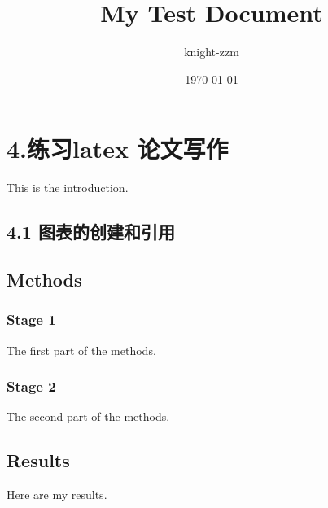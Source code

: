 \documentclass[a4paper,12pt]{report}
\begin{document}
\title{My Test Document}
\author{knight-zzm}
\date{\today}
\maketitle

\chapter*{4.练习latex 论文写作}
This is the introduction.

\section*{4.1 图表的创建和引用}
\section{Methods}

\subsection{Stage 1}
The first part of the methods.

\subsection{Stage 2}
The second part of the methods.

\section{Results}
Here are my results.
\end{document}
